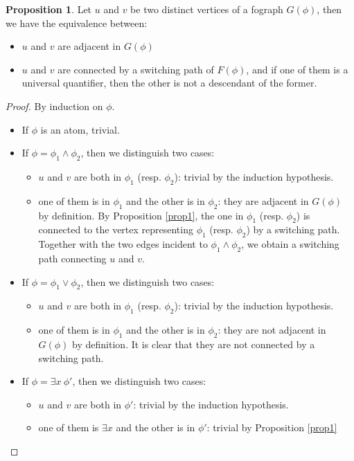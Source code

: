 \documentclass{article}
\theoremstyle{definition}
\newtheorem{proposition}[thm]{Proposition}
\begin{document}
\begin{proposition}
\label{prop2}
Let $u$ and $v$ be two distinct vertices of a fograph $G(\phi)$, then we have the equivalence
between:
\begin{itemize}
  \item $u$ and $v$ are adjacent in $G(\phi)$
  \item $u$ and $v$ are connected by a switching path of $F(\phi)$, and if one of them is a universal quantifier, then the other is
	not a descendant of the former.
  \end{itemize}
\begin{proof}
By induction on $\phi$.
\begin{itemize}
  \item If $\phi$ is an atom, trivial.
  \item If $\phi = \phi_1 \wedge \phi_2$, then we distinguish two cases:
    \begin{itemize}
      \item $u$ and $v$ are both in $\phi_1$ (resp. $\phi_2$): trivial by
	      the induction hypothesis.
      \item one of them is in $\phi_1$ and the other is in $\phi_2$: they are
	      adjacent in $G(\phi)$ by definition. By Proposition \ref{prop1},
		    the one in $\phi_1$ (resp. $\phi_2$) is connected to the
		    vertex representing $\phi_1$ (resp. $\phi_2$) by a switching
		    path. Together with the two edges incident to $\phi_1 \wedge
		    \phi_2$, we obtain a switching path connecting $u$ and $v$.
    \end{itemize}
  \item If $\phi = \phi_1 \vee \phi_2$, then we distinguish two cases:
    \begin{itemize}
      \item $u$ and $v$ are both in $\phi_1$ (resp. $\phi_2$): trivial by
	      the induction hypothesis.
      \item one of them is in $\phi_1$ and the other is in $\phi_2$: they are not
	      adjacent in $G(\phi)$ by definition. It is clear that they
		    are not connected by a switching path.
    \end{itemize}
  \item If $\phi = \exists x \ \phi'$, then we distinguish two cases:
    \begin{itemize}
      \item $u$ and $v$ are both in $\phi'$: trivial by the induction
	      hypothesis.
      \item one of them is $\exists x$ and the other is in $\phi'$: trivial
	      by Proposition \ref{prop1}


\end{itemize}
\end{itemize}
\end{proof}
\end{proposition}
\end{document}
